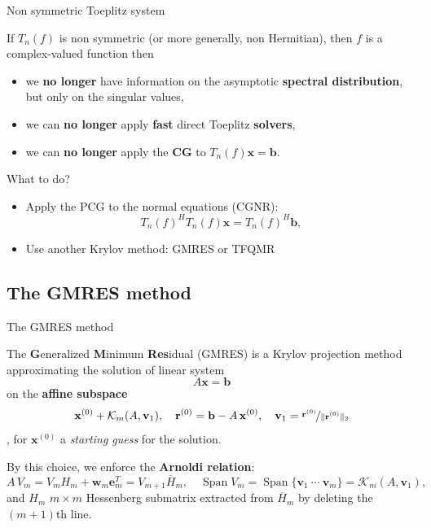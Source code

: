 \documentclass[aspectratio=169,xcolor=dvipsnames]{beamer}
\begin{document}
\begin{frame}{Non symmetric Toeplitz system}

If $T_n(f)$ is non symmetric (or more generally, non Hermitian), then $f$ is a complex-valued function then
\begin{itemize}
	\item[\faBomb] we \textbf{no longer} have information on the asymptotic \textbf{spectral distribution}, but only on the singular values,
	\item[\faBomb] we can \textbf{no longer} apply \textbf{fast} direct Toeplitz \textbf{solvers},
	\item[\faBomb] we can \textbf{no longer} apply the \textbf{CG} to $T_n(f)\mathbf{x} = \mathbf{b}$.
\end{itemize}
\alert{\faQuestionCircle}\; What to do?
\begin{itemize}
	\item[\faDoorOpen]<2-> Apply the PCG to the normal equations (CGNR):
	\[
	T_n(f)^H T_n(f) \mathbf{x} = T_n(f)^H \mathbf{b},
	\]
	\item[\faDoorOpen]<3-> Use another Krylov method: GMRES or TFQMR 
	
\end{itemize}

\end{frame}

\subsection{The GMRES method}

\begin{frame}{The GMRES method \parencite{GMRES}}

The \textbf{G}eneralized \textbf{M}inimum \textbf{Res}idual (GMRES) is a Krylov projection method
approximating the solution of linear system 
\[A\mathbf{x}=\mathbf{b}\] 
on the \textbf{affine subspace} 
\[\mathbf{x}^{(0)}+\mathcal{K}_m(A,\mathbf{v}_1), \quad \mathbf{r}^{(0)} = \mathbf{b}-A\,\mathbf{x}^{(0)}, \quad \mathbf{v}_1 = 
\nicefrac{\mathbf{r}^{(0)}}{\|\mathbf{r}^{(0)}\|_2} \],  
for $\mathbf{x}^{(0)}$ a \emph{starting guess} for the solution.

By this choice, we enforce the \textbf{Arnoldi relation}:
\begin{equation*}
	A\, V_m = V_m H_m+\mathbf{w}_m \mathbf{e}_m^T=V_{m+1}\overline{H}_m, \quad \operatorname{Span} V_m= \operatorname{Span}\{\mathbf{v}_1 \  \cdots \  \mathbf{v}_m\} = \mathcal{K}_m(A,\mathbf{v}_1),
\end{equation*}
and $H_m$ $m\times m$ Hessenberg submatrix extracted from $\overline{H}_m$ by deleting the $(m+1)$th
line.


\end{frame}
\end{document}
